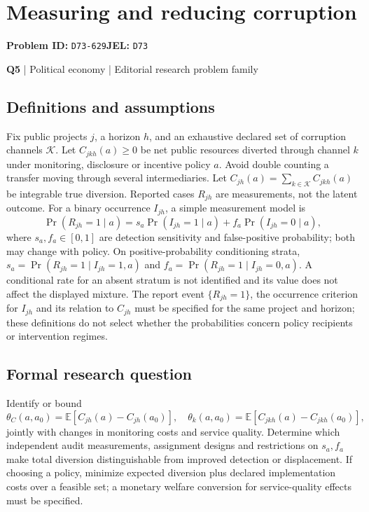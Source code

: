 \documentclass[11pt,a4paper]{article}
\begin{document}
\section*{Measuring and reducing corruption}
\textbf{Problem ID:} \texttt{D73-629}\quad \textbf{JEL:} \texttt{D73}\par
\label{problem:OP-0125}
\label{atlas:prob:Q5}
{\sffamily\small\color{muted}\textbf{Q5} | Political economy | Editorial research problem family\par}
\subsection*{Definitions and assumptions}
Fix public projects $j$, a horizon $h$, and an exhaustive declared set of corruption channels $\mathcal K$. Let $C_{jkh}(a)\geq0$ be net public resources diverted through channel $k$ under monitoring, disclosure or incentive policy $a$. Avoid double counting a transfer moving through several intermediaries. Let $C_{jh}(a)=\sum_{k\in\mathcal K}C_{jkh}(a)$ be integrable true diversion. Reported cases $R_{jh}$ are measurements, not the latent outcome. For a binary occurrence $I_{jh}$, a simple measurement model is
\[
\Pr(R_{jh}=1\mid a)=s_a\Pr(I_{jh}=1\mid a)+f_a\Pr(I_{jh}=0\mid a),
\]
where $s_a,f_a\in[0,1]$ are detection sensitivity and false-positive probability; both may change with policy. On positive-probability conditioning strata, $s_a=\Pr(R_{jh}=1\mid I_{jh}=1,a)$ and $f_a=\Pr(R_{jh}=1\mid I_{jh}=0,a)$. A conditional rate for an absent stratum is not identified and its value does not affect the displayed mixture. The report event $\{R_{jh}=1\}$, the occurrence criterion for $I_{jh}$ and its relation to $C_{jh}$ must be specified for the same project and horizon; these definitions do not select whether the probabilities concern policy recipients or intervention regimes.
\subsection*{Formal research question}
Identify or bound
\[
\theta_C(a,a_0)=\mathbb E[C_{jh}(a)-C_{jh}(a_0)],\quad
\theta_k(a,a_0)=\mathbb E[C_{jkh}(a)-C_{jkh}(a_0)],
\]
jointly with changes in monitoring costs and service quality. Determine which independent audit measurements, assignment designs and restrictions on $s_a,f_a$ make total diversion distinguishable from improved detection or displacement. If choosing a policy, minimize expected diversion plus declared implementation costs over a feasible set; a monetary welfare conversion for service-quality effects must be specified.
\end{document}
